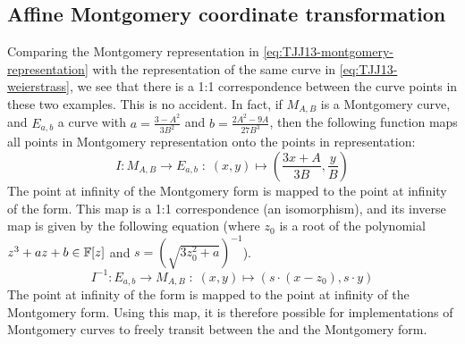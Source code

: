 \subsection{Affine Montgomery coordinate transformation} Comparing the Montgomery representation in \eqref{eq:TJJ13-montgomery-representation} with the  representation of the same curve in \eqref{eq:TJJ13-weierstrass}, we see that there is a 1:1 correspondence between the curve points in these two examples. This is no accident. In fact, if $M_{A,B}$ is a Montgomery curve, and $E_{a,b}$ a  curve with $a = \frac{3-A^2}{3B^2}$ and $b= \frac{2A^2 -9A}{27B^3}$, then the following function maps all points in Montgomery representation onto the points in  representation:
\begin{equation}
I: M_{A,B} \to E_{a,b}\; : \; (x,y) \mapsto \left(\frac{3x + A}{3B}, \frac{y}{B}\right)
\end{equation}
The point at infinity of the Montgomery form is mapped to the point at infinity of the  form. This map is a 1:1 correspondence (an isomorphism), and its inverse map is given by the following equation (where $z_0$ is a root of the polynomial $z^3 + a z + b \in \mathbb{F}[z]$ and $s=({\sqrt{3z_0^{2}+a}})^{-1}$).
\begin{equation}
I^{-1}: E_{a,b} \to M_{A,B}\; : \; (x,y) \mapsto \left(s\cdot(x-z_0), s\cdot y\right)
\end{equation}
The point at infinity of the  form is mapped to the point at infinity of the Montgomery form. Using this map, it is therefore possible for implementations of Montgomery curves to freely transit between the  and the Montgomery form. 
 
